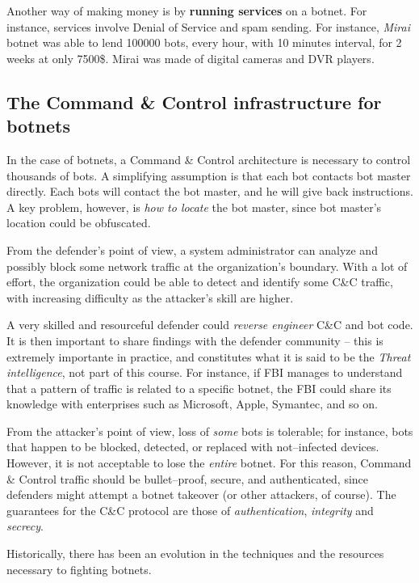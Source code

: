 \documentclass[10pt]{extbook}
\begin{document}
Another way of making money is by \textbf{running services} on a botnet. For
instance, services involve Denial of Service and spam sending. For instance,
\emph{Mirai} botnet was able to lend 100000 bots, every hour, with 10 minutes
interval, for 2 weeks at only 7500\$. Mirai was made of digital cameras and DVR
players.

\subsection{The Command \& Control infrastructure for botnets}

In the case of botnets, a Command \& Control architecture is necessary to
control thousands of bots. A simplifying assumption is that each bot contacts
bot master directly. Each bots will contact the bot master, and he will give
back instructions. A key problem, however, is \emph{how to locate} the bot
master, since bot master's location could be obfuscated.

From the defender's point of view, a system administrator can analyze and
possibly block some network traffic at the organization's boundary. With a lot
of effort, the organization could be able to detect and identify some C\&C
traffic, with increasing difficulty as the attacker's skill are higher.

A very skilled and resourceful defender could \emph{reverse engineer} C\&C and
bot code. It is then important to share findings with the defender community --
this is extremely importante in practice, and constitutes what it is said to be
the \emph{Threat intelligence}, not part of this course. For instance, if FBI
manages to understand that a pattern of traffic is related to a specific
botnet, the FBI could share its knowledge with enterprises such as Microsoft,
Apple, Symantec, and so on.

From the attacker's point of view, loss of \emph{some} bots is tolerable; for
instance, bots that happen to be blocked, detected, or replaced with
not--infected devices. However, it is not acceptable to lose the \emph{entire}
botnet. For this reason, Command \& Control traffic should be bullet--proof,
secure, and authenticated, since defenders might attempt a botnet takeover (or
other attackers, of course). The guarantees for the C\&C protocol are those of
\emph{authentication}, \emph{integrity} and \emph{secrecy}.

Historically, there has been an evolution in the techniques and the resources
necessary to fighting botnets.
\end{document}
